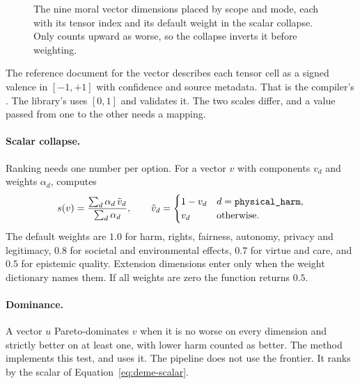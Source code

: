 \begin{figure}[t]
\centering

\caption{The nine moral vector dimensions placed by scope and mode, each with its tensor index
and its default weight in the scalar collapse. Only  counts upward as worse,
so the collapse inverts it before weighting.}
\label{fig:deme-vector}
\end{figure}

The reference document for the vector describes each tensor cell as a signed valence in
$[-1,+1]$ with confidence and source metadata. That is the compiler's . The
library's  uses $[0,1]$ and validates it. The two scales differ, and a value
passed from one to the other needs a mapping.

\paragraph{Scalar collapse.} Ranking needs one number per option. For a vector $v$ with
components $v_d$ and weights $\alpha_d$,  computes
\begin{equation}
s(v) = \frac{\sum_{d} \alpha_d\, \tilde v_d}{\sum_{d} \alpha_d},
\qquad
\tilde v_d =
\begin{cases}
1 - v_d & d = \texttt{physical\_harm},\\
v_d & \text{otherwise.}
\end{cases}
\label{eq:deme-scalar}
\end{equation}
The default weights are $1.0$ for harm, rights, fairness, autonomy, privacy and legitimacy,
$0.8$ for societal and environmental effects, $0.7$ for virtue and care, and $0.5$ for epistemic
quality. Extension dimensions enter only when the weight dictionary names them. If all weights
are zero the function returns $0.5$.

\paragraph{Dominance.} A vector $u$ Pareto-dominates $v$ when it is no worse on every dimension
and strictly better on at least one, with lower harm counted as better. The method
 implements this test, and  uses it. The
pipeline does not use the frontier. It ranks by the scalar of Equation~\eqref{eq:deme-scalar}.

